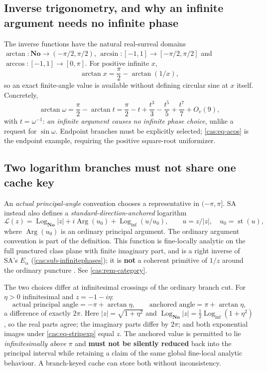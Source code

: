 \documentclass[11pt,letterpaper]{article}
\numberwithin{equation}{section}
\theoremstyle{definition}
\theoremstyle{remark}
\newcommand{\No}{\mathbf{No}}
\newcommand{\st}{\operatorname{st}}
\newcommand{\LogNo}{\operatorname{Log}_{\No}}
\newcommand{\Logi}{\operatorname{Log}_{\mathrm{inf}}}
\newcommand{\Ov}[1]{O_v(#1)}
\DeclareMathOperator{\Arg}{Arg}
\begin{document}
\subsection{Inverse trigonometry, and why an infinite argument needs no infinite phase}
\label{cas:sub-inversetrig}
The inverse functions have the natural real-surreal domains
$\arctan:\No\to(-\pi/2,\pi/2)$, $\arcsin:[-1,1]\to[-\pi/2,\pi/2]$ and
$\arccos:[-1,1]\to[0,\pi]$. For positive infinite $x$,
\[
 \arctan x=\frac\pi2-\arctan(1/x),
\]
so an exact finite-angle value is available without defining circular sine at
$x$ itself. Concretely,
\[
 \arctan\omega=\frac\pi2-\arctan t
 =\frac\pi2-t+\frac{t^3}{3}-\frac{t^5}{5}+\frac{t^7}{7}+\Ov{9},
\]
with $t=\omega^{-1}$: \emph{an infinite argument causes no infinite phase
choice}, unlike a request for $\sin\omega$. Endpoint branches must be explicitly
selected; \eqref{cas:eq-acos} is the endpoint example, requiring the positive
square-root uniformizer.

\subsection{Two logarithm branches must not share one cache key}
\label{cas:sub-logbranches}
An \emph{actual principal-angle} convention chooses a representative in
$(-\pi,\pi]$. SA instead also defines a \emph{standard-direction-anchored}
logarithm
\begin{equation}\label{cas:eq-anchoredlog}
 \mathcal L(z)=\LogNo|z|+i\Arg(u_0)+\Logi(u/u_0),
 \qquad u=z/|z|,\quad u_0=\st(u),
\end{equation}
where $\Arg(u_0)$ is an ordinary principal argument. The ordinary argument
convention is part of the definition. This function is fine-locally analytic on
the full punctured class plane with finite imaginary part, and is a right
inverse of SA's $E_\alpha$ (\cref{cas:sub-infinitephases}); it is \textbf{not} a
coherent primitive of $1/z$ around the ordinary puncture
\cite{cas:SourceAnalysisTwo,cas:SourceAnalysisThree}. See
\cref{cas:rem-category}.

The two choices differ at infinitesimal crossings of the ordinary branch cut.
For $\eta>0$ infinitesimal and $z=-1-i\eta$:
\[
 \text{actual principal angle}=-\pi+\arctan\eta,
 \qquad
 \text{anchored angle}=\pi+\arctan\eta ,
\]
a difference of exactly $2\pi$. Here $|z|=\sqrt{1+\eta^2}$ and
$\LogNo|z|=\tfrac12\Logi(1+\eta^2)$, so the real parts agree; the imaginary
parts differ by $2\pi$; and both exponential images under
\eqref{cas:eq-stripexp} equal $z$. The anchored value is permitted to lie
\emph{infinitesimally above} $\pi$ and \textbf{must not be silently reduced}
back into the principal interval while retaining a claim of the same global
fine-local analytic behaviour. A branch-keyed cache can store both without
inconsistency.
\end{document}
